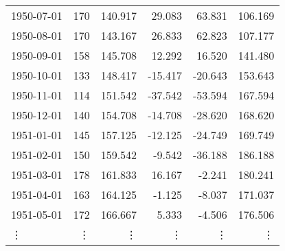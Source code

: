 \begin{tabular}{l|rrrrr}
1950-07-01 & \cellcolor{lorange}170 & 140.917 & \cellcolor{lblue}29.083 & \cellcolor{blue}63.831 & 106.169 \\
1950-08-01 & \cellcolor{lorange}170 & 143.167 & 26.833 & 62.823 & 107.177 \\
1950-09-01 & \cellcolor{lorange}158 & 145.708 & 12.292 & 16.520 & 141.480 \\
1950-10-01 & \cellcolor{lorange}133 & 148.417 & -15.417 & -20.643 & 153.643 \\
1950-11-01 & \cellcolor{lorange}114 & \cellcolor{orange}151.542 & -37.542 & -53.594 & 167.594 \\
1950-12-01 & \cellcolor{lorange}140 & 154.708 & -14.708 & -28.620 & 168.620 \\
1951-01-01 & \cellcolor{lorange}145 & 157.125 & -12.125 & -24.749 & 169.749 \\
1951-02-01 & \cellcolor{lorange}150 & 159.542 & -9.542 & -36.188 & 186.188 \\
1951-03-01 & \cellcolor{lorange}178 & 161.833 & 16.167 & -2.241 & 180.241 \\
1951-04-01 & \cellcolor{lorange}163 & 164.125 & -1.125 & -8.037 & 171.037 \\
1951-05-01 & \cellcolor{lorange}172 & 166.667 & 5.333 & -4.506 & 176.506 \\
\vdots & \vdots & \vdots & \vdots & \vdots & \vdots \\
\bottomrule 
\end{tabular}
